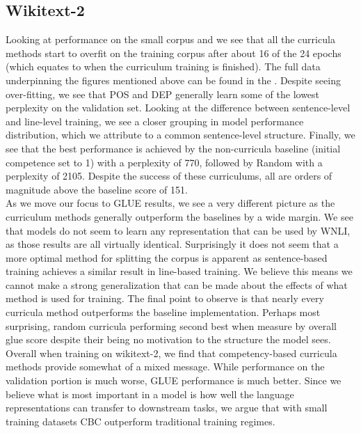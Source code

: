 \subsection{Wikitext-2}
Looking at performance on the small corpus  and  we see that all the curricula methods start to overfit on the training corpus after about 16 of the 24 epochs (which equates to when the curriculum training is finished). The full data underpinning the figures mentioned above can be found in the . Despite seeing over-fitting, we see that POS and DEP generally learn some of the lowest perplexity on the validation set. Looking at the difference between sentence-level and line-level training, we see a closer grouping in model performance distribution, which we attribute to a common sentence-level structure. Finally, we see that the best performance is achieved by the non-curricula baseline (initial competence set to 1) with a perplexity of 770, followed by Random with a perplexity of 2105. Despite the success of these curriculums, all are orders of magnitude above the baseline score of 151. \\
As we move our focus to GLUE results, we see a very different picture as the curriculum methods generally outperform the baselines by a wide margin. We see that models do not seem to learn any representation that can be used by WNLI, as those results are all virtually identical. Surprisingly it does not seem that a more optimal method for splitting the corpus is apparent as sentence-based training achieves a similar result in line-based training. We believe this means we cannot make a strong generalization that can be made about the effects of what method is used for training. The final point to observe is that nearly every curricula method outperforms the baseline implementation. Perhaps most surprising, random curricula performing second best when measure by overall glue score despite their being no motivation to the structure the model sees. \\
Overall when training on wikitext-2, we find that competency-based curricula methods provide somewhat of a mixed message. While performance on the validation portion is much worse, GLUE performance is much better. Since we believe what is most important in a model is how well the language representations can transfer to downstream tasks, we argue that with small training datasets CBC outperform traditional training regimes.

